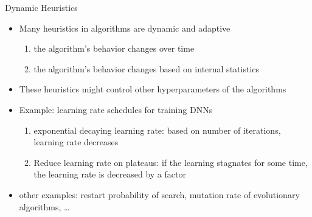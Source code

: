 \begin{frame}[c]{Dynamic Heuristics}
	
	\begin{itemize}
		\item Many heuristics in algorithms are dynamic and adaptive
		\begin{enumerate}
			\item the algorithm's behavior changes over time
			\item the algorithm's behavior changes based on internal statistics
		\end{enumerate}
		\medskip
		\item These heuristics might control other hyperparameters of the algorithms
		\pause
		\smallskip
		\item Example: learning rate schedules for training DNNs
		\begin{enumerate}
			\item exponential decaying learning rate: based on number of iterations, learning rate decreases
			\pause
			\item Reduce learning rate on plateaus: if the learning stagnates for some time, the learning rate is decreased by a factor
		\end{enumerate}
		\pause
		\smallskip
		\item other examples: restart probability of search, mutation rate of evolutionary algorithms, \ldots  
		
	\end{itemize}
	
\end{frame}
